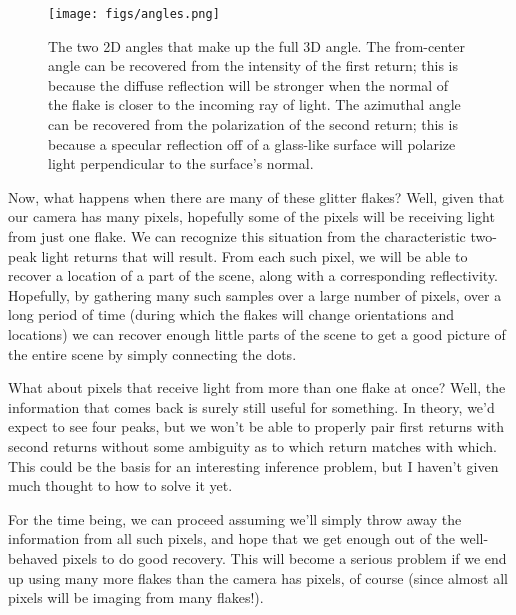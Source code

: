 \documentclass[11pt]{article}
\begin{document}

\begin{figure}
\begin{center}
\texttt{[image: figs/angles.png]} 
\caption{The two 2D angles that make up the full 3D angle. The from-center angle can be recovered from the intensity of the first return; this is because the diffuse reflection will be stronger when the normal of the flake is closer to the incoming ray of light. The azimuthal angle can be recovered from the polarization of the second return; this is because a specular reflection off of a glass-like surface will polarize light perpendicular to the surface's normal.  \label{fig:angles}}
\end{center}
\end{figure}

Now, what happens when there are many of these glitter flakes? Well, given that our camera has many pixels, hopefully some of the pixels will be receiving light from just one flake. We can recognize this situation from the characteristic two-peak light returns that will result. From each such pixel, we will be able to recover a location of a part of the scene, along with a corresponding reflectivity. Hopefully, by gathering many such samples over a large number of pixels, over a long period of time (during which the flakes will change orientations and locations) we can recover enough little parts of the scene to get a good picture of the entire scene by simply connecting the dots.

What about pixels that receive light from more than one flake at once? Well, the information that comes back is surely still useful for something. In theory, we'd expect to see four peaks, but we won't be able to properly pair first returns with second returns without some ambiguity as to which return matches with which. This could be the basis for an interesting inference problem, but I haven't given much thought to how to solve it yet. 

For the time being, we can proceed assuming we'll simply throw away the information from all such pixels, and hope that we get enough out of the well-behaved pixels to do good recovery. This will become a serious problem if we end up using many more flakes than the camera has pixels, of course (since almost all pixels will be imaging from many flakes!).
\end{document}
